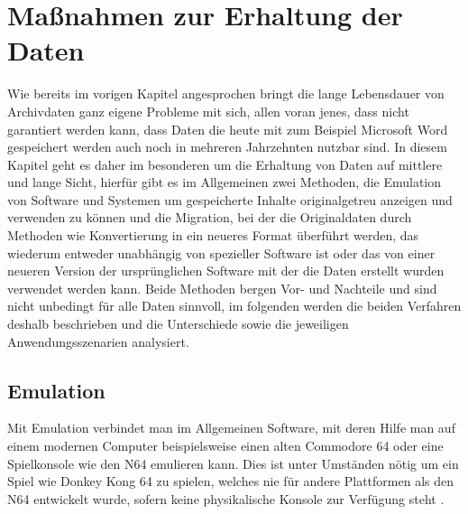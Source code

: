 \documentclass[conference,compsoc,final,a4paper]{IEEEtran}
\begin{document}
\section{Maßnahmen zur Erhaltung der Daten}
Wie bereits im vorigen Kapitel angesprochen bringt die lange Lebensdauer von Archivdaten ganz eigene Probleme mit sich, allen voran jenes, dass nicht garantiert werden kann, dass Daten die heute mit zum Beispiel Microsoft Word gespeichert werden auch noch in mehreren Jahrzehnten nutzbar sind. In diesem Kapitel geht es daher im besonderen um die Erhaltung von Daten auf mittlere und lange Sicht, hierfür gibt es im Allgemeinen zwei Methoden, die Emulation von Software und Systemen um gespeicherte Inhalte originalgetreu anzeigen und verwenden zu können und die Migration, bei der die Originaldaten durch Methoden wie Konvertierung in ein neueres Format überführt werden, das wiederum entweder unabhängig von spezieller Software ist oder das von einer neueren Version der ursprünglichen Software mit der die Daten erstellt wurden verwendet werden kann. Beide Methoden bergen Vor- und Nachteile und sind nicht unbedingt für alle Daten sinnvoll, im folgenden werden die beiden Verfahren deshalb beschrieben und die Unterschiede sowie die jeweiligen Anwendungsszenarien analysiert.

\subsection{Emulation}
Mit Emulation verbindet man im Allgemeinen Software, mit deren Hilfe man auf einem modernen Computer beispielsweise einen alten Commodore 64 oder eine Spielkonsole wie den N64 emulieren kann. Dies ist unter Umständen nötig um ein Spiel wie Donkey Kong 64 zu spielen, welches nie für andere Plattformen als den N64 entwickelt wurde, sofern keine physikalische Konsole zur Verfügung steht \autocite{ViceEmu,Project64}.
\end{document}
